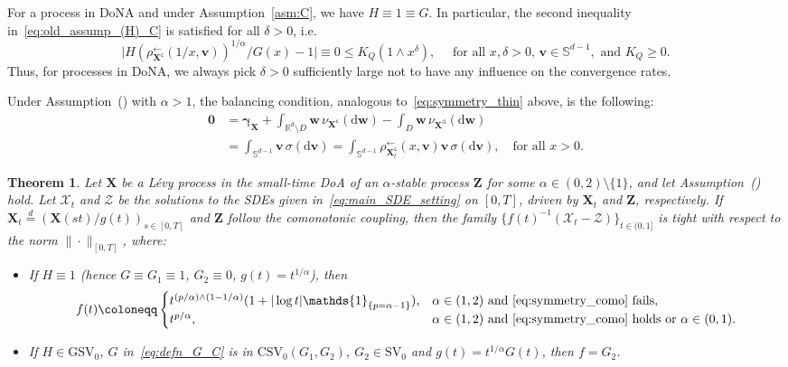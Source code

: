 \documentclass[en,oneside,bbfont,article]{amsart}
\newtheorem{theorem}{Theorem}[section]
\theoremstyle{remark}
\newenvironment{remark}
    {\pushQED{\qed}\renewcommand{\qedsymbol}{$\Diamond$}\remarkx}
    {\popQED\endremarkx}
\theoremstyle{definition}
\theoremstyle{definition}
\newcommand\X{\bm{\mathcal{X}}}
\newcommand\ZZ{\bm{\mathcal{Z}}}
\newcommand\Sp{\mathbb{S}}
\newcommand\R{\mathbb{R}}
\newcommand\1{\mathds{1}}
\newcommand\SV{\mathrm{SV}}
\newcommand\CSV{\mathrm{CSV}}
\newcommand\GSV{\mathrm{GSV}}
\newcommand\la{\leftarrow}
\renewcommand\le{\leqslant}
\renewcommand\ge{\geqslant}
\newcommand\eqd{\overset{d}{=}}
\newcommand\co{\mathsf{c}}
\newcommand\nf[1]{\normalfont{#1}}
\newcommand{\D}{\mathrm{d}}
\begin{document}
\begin{remark}\label{rem:DoNA_como_delta_large}
For a process in DoNA and under Assumption~\ref{asm:C}, we have $H\equiv 1 \equiv G$. In particular, the second inequality in~\eqref{eq:old_assump_(H)_C} is satisfied for all $\delta>0$, i.e. 
\begin{equation*}
    \big|H(\rho_{\bm{X}^\co}^{\la}(1/x,\bm{v}))^{1/\alpha}/G(x)-1\big|\equiv 0
\le K_Q(1\wedge x^{\delta}), \quad \text{ for all }x,\delta >0, \, \bm{v} \in \Sp^{d-1}, \text{ and }K_Q\ge 0.
\end{equation*} 
Thus, for processes in DoNA, we always pick $\delta>0$ sufficiently large not to have any influence on the convergence rates. 
\end{remark}

Under Assumption~() with $\alpha>1$, the balancing condition, analogous to~\eqref{eq:symmetry_thin} above, is the following:
\begin{equation}
\label{eq:symmetry_como}
\begin{split}
\bm{0}
&=\bm{\gamma}_{\bm{X}}+\int_{\R^d\setminus D}\!\!\bm{w}\,\nu_{\bm{X}^\co}(\D\bm{w})
-\int_{D}\bm{w}\,\nu_{\bm{X}^\D}(\D\bm{w})\\
&=\int_{\Sp^{d-1}}\!\!\bm{v}\,\sigma(\D\bm{v})
=\int_{\Sp^{d-1}}\!\!\rho^{\la}_{\bm{X}_t^\co}(x,\bm{v})\bm{v}\,\sigma(\D\bm{v}), 
\quad\text{for all } x>0.
\end{split}
\end{equation}

\begin{theorem}
\label{thm:main_res_C}
Let $\bm{X}$ be a L\'evy process in the small-time DoA of an $
\alpha$-stable process $\bm{Z}$ for some $\alpha \in (0,2)\setminus\{1\}$, and let Assumption~() hold. Let $\X_t$ and $\ZZ$ be the solutions to the SDEs given in~\eqref{eq:main_SDE_setting} on $[0,T]$, driven by $\bm{X}_t$ and $\bm{Z}$, respectively. If $\bm{X}_t\eqd(\bm{X}(st)/g(t))_{s\in[0,T]}$ and $\bm{Z}$ follow the comonotonic coupling, then the family $\{f(t)^{-1}(\X_t-\ZZ)\}_{t\in(0,1]}$ is tight with respect to the norm $\|\cdot\|_{[0,T]}$, where:
\begin{itemize}[leftmargin=4.5em]
\item[\nf{\textbf{DoNA}}]%
\!If $H\equiv 1$ (hence $G\equiv G_1\equiv 1$, $G_2\equiv 0$, $g(t)=t^{1/\alpha}$), then  
\[
f(t)\coloneqq
\begin{cases}
t^{(p/\alpha)\wedge (1-1/\alpha) }(1+|\log t|\1_{\{p=\alpha-1\}}), &\alpha\in(1,2)\text{ and \eqref{eq:symmetry_como} fails}, \\
t^{p/\alpha}, &\alpha\in(1,2)\text{ and \eqref{eq:symmetry_como} holds or }\alpha\in(0,1).
\end{cases}
\]
\item[\nf{\textbf{DoNNA}}]%
\!If $H\in\GSV_0$, $G$ in~\eqref{eq:defn_G_C} is in $\CSV_0(G_1,G_2)$, $G_2\in\SV_0$ and $g(t)=t^{1/\alpha}G(t)$, then $f=G_2$.
\end{itemize}
\end{theorem}
\end{document}
